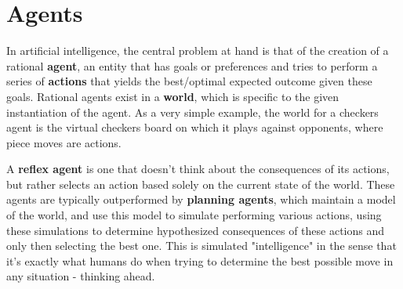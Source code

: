 \documentclass[11pt,fleqn]{article}
\def\title{Note \the\lecturenumber}
\begin{document}
\maketitle

\section*{Agents}

In artificial intelligence, the central problem at hand is that of the creation of a rational \textbf{agent}, an entity that has goals or preferences and tries to perform a series of \textbf{actions} that yields the best/optimal expected outcome given these goals. Rational agents exist in a \textbf{world}, which is specific to the given instantiation of the agent. As a very simple example, the world for a checkers agent is the virtual checkers board on which it plays against opponents, where piece moves are actions. 

A \textbf{reflex agent} is one that doesn't think about the consequences of its actions, but rather selects an action based solely on the current state of the world. These agents are typically outperformed by \textbf{planning agents}, which maintain a model of the world, and use this model to simulate performing various actions, using these simulations to determine hypothesized consequences of these actions and only then selecting the best one. This is simulated "intelligence" in the sense that it's exactly what humans do when trying to determine the best possible move in any situation - thinking ahead.


\end{document}
\end{document}
